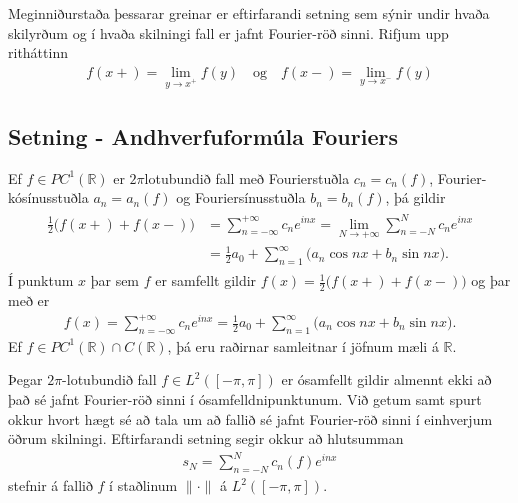 \documentclass[a4paper,10pt,icelandic]{sphinxmanual}
\begin{document}
Meginniðurstaða þessarar greinar er eftirfarandi setning sem sýnir undir hvaða skilyrðum og í hvaða skilningi fall er jafnt Fourier-röð sinni. Rifjum upp ritháttinn
\begin{equation*}
\begin{split}f(x+) = \lim_{y \to x^+} f(y) \quad \text{og} \quad f(x-) = \lim_{y \to x^-} f(y)\end{split}
\end{equation*}

\subsection{Setning - Andhverfuformúla Fouriers}
\label{\detokenize{Kafli02:setning-andhverfuformula-fouriers}}
Ef \(f\in PC^1({{\mathbb  R}})\) er \(2\pi\)\textendash{}lotubundið fall með
Fourier\textendash{}stuðla \(c_n=c_n(f)\), Fourier-kósínus\textendash{}stuðla
\(a_n=a_n(f)\) og Fourier\textendash{}sínus\textendash{}stuðla \(b_n=b_n(f)\), þá gildir
\begin{equation*}
\begin{split}\begin{aligned}
 \tfrac 12\big(f(x+)+f(x-)\big) &=
 \sum\limits_{n=-\infty}^{+\infty} c_ne^{inx} =
 \lim\limits_{N\to+\infty}\sum\limits_{n=-N}^{N} c_ne^{inx}\\
 &=\tfrac 12 a_0 + \sum\limits_{n=1}^\infty \big(a_n \cos nx + b_n\sin
 nx\big).\end{aligned}\end{split}
\end{equation*}
Í punktum \(x\) þar sem \(f\) er samfellt gildir
\(f(x)=\tfrac 12\big(f(x+)+f(x-)\big)\) og þar með er
\begin{equation*}
\begin{split}f(x)=
 \sum\limits_{n=-\infty}^{+\infty} c_ne^{inx}
 =\tfrac 12 a_0 + \sum\limits_{n=1}^\infty \big(a_n \cos nx + b_n\sin
 nx\big).\end{split}
\end{equation*}
Ef \(f\in PC^1({{\mathbb  R}})\cap C({{\mathbb  R}})\), þá eru
raðirnar samleitnar í jöfnum mæli á \({{\mathbb  R}}\).

Þegar \(2\pi\)-lotubundið fall \(f\in L^2([-\pi,\pi])\) er ósamfellt gildir almennt ekki að það sé jafnt Fourier-röð sinni í ósamfelldnipunktunum. Við getum samt spurt okkur hvort hægt sé að tala um að fallið sé jafnt Fourier-röð sinni í einhverjum öðrum skilningi. Eftirfarandi setning segir okkur að hlutsumman
\begin{equation*}
\begin{split}s_N = \sum_{n=-N}^{N}
c_n(f) e^{in x}\end{split}
\end{equation*}
stefnir á fallið \(f\) í staðlinum \(\|\cdot\|\) á \(L^2([-\pi,\pi])\).
\end{document}
